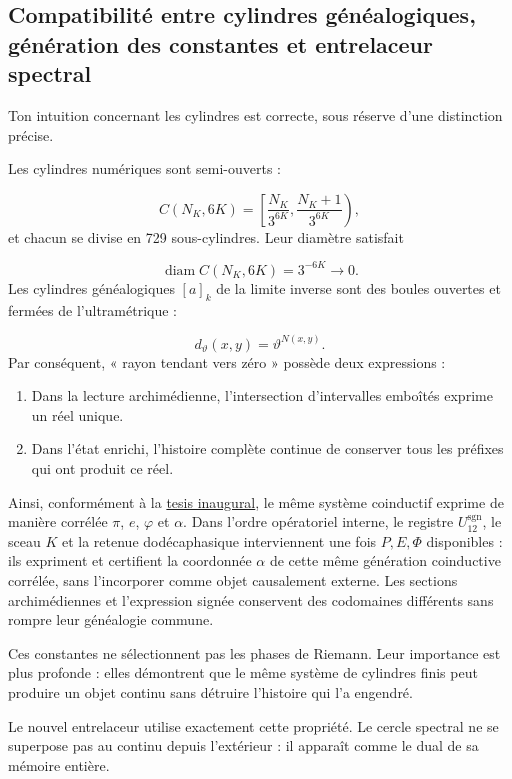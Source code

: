 \subsection{Compatibilité entre cylindres généalogiques, génération des constantes et entrelaceur spectral}
Ton intuition concernant les cylindres est correcte, sous réserve d'une distinction précise.\par
Les cylindres numériques sont semi-ouverts :\par
\[
C(N_K,6K)
=
\left[
\frac{N_K}{3^{6K}},
\frac{N_K+1}{3^{6K}}
\right),
\]
et chacun se divise en 729 sous-cylindres. Leur diamètre satisfait\par
\[
\operatorname{diam}C(N_K,6K)=3^{-6K}\longrightarrow0.
\]
Les cylindres généalogiques \([a]_k\) de la limite inverse sont des boules ouvertes et fermées de l'ultramétrique :\par
\[
d_\vartheta(x,y)
=
\vartheta^{N(x,y)}.
\]
Par conséquent, « rayon tendant vers zéro » possède deux expressions :\par
\begin{enumerate}
\item Dans la lecture archimédienne, l'intersection d'intervalles emboîtés exprime un réel unique.
\item Dans l'état enrichi, l'histoire complète continue de conserver tous les préfixes qui ont produit ce réel.
\end{enumerate}
Ainsi, conformément à la \hyperref[sec:tesis-inaugural-helicoidal-hmt-md]{tesis inaugural}, le même système coinductif exprime de manière corrélée \(\pi\), \(e\), \(\varphi\) et \(\alpha\). Dans l'ordre opératoriel interne, le registre \(U_{12}^{\mathrm{sgn}}\), le sceau \(K\) et la retenue dodécaphasique interviennent une fois \(P,E,\Phi\) disponibles : ils expriment et certifient la coordonnée \(\alpha\) de cette même génération coinductive corrélée, sans l'incorporer comme objet causalement externe. Les sections archimédiennes et l'expression signée conservent des codomaines différents sans rompre leur généalogie commune.\par
Ces constantes ne sélectionnent pas les phases de Riemann. Leur importance est plus profonde : elles démontrent que le même système de cylindres finis peut produire un objet continu sans détruire l'histoire qui l'a engendré.\par
Le nouvel entrelaceur utilise exactement cette propriété. Le cercle spectral ne se superpose pas au continu depuis l'extérieur : il apparaît comme le dual de sa mémoire entière.\par
{}
